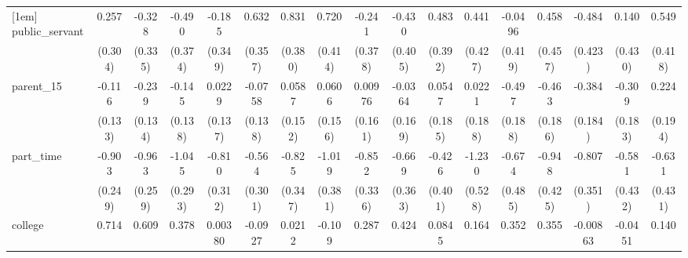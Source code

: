 {\begin{tabular}{l*{16}{c}}
[1em]
public\_servant      &       0.257         &      -0.328         &      -0.490         &      -0.185         &       0.632         &       0.831\sym{*}  &       0.720         &      -0.241         &      -0.430         &       0.483         &       0.441         &     -0.0496         &       0.458         &      -0.484         &       0.140         &       0.549         \\
                    &     (0.304)         &     (0.335)         &     (0.374)         &     (0.349)         &     (0.357)         &     (0.380)         &     (0.414)         &     (0.378)         &     (0.405)         &     (0.392)         &     (0.427)         &     (0.419)         &     (0.457)         &     (0.423)         &     (0.430)         &     (0.418)         \\
[1em]
parent\_15           &      -0.116         &      -0.239         &      -0.145         &      0.0229         &     -0.0758         &      0.0587         &      0.0606         &     0.00976         &     -0.0364         &      0.0547         &      0.0221         &      -0.497\sym{**} &      -0.463\sym{*}  &      -0.384\sym{*}  &      -0.309         &       0.224         \\
                    &     (0.133)         &     (0.134)         &     (0.138)         &     (0.137)         &     (0.138)         &     (0.152)         &     (0.156)         &     (0.161)         &     (0.169)         &     (0.185)         &     (0.188)         &     (0.188)         &     (0.186)         &     (0.184)         &     (0.183)         &     (0.194)         \\
[1em]
part\_time           &      -0.903\sym{***}&      -0.963\sym{***}&      -1.045\sym{***}&      -0.810\sym{**} &      -0.564         &      -0.825\sym{*}  &      -1.019\sym{**} &      -0.852\sym{*}  &      -0.669         &      -0.426         &      -1.230\sym{*}  &      -0.674         &      -0.948\sym{*}  &      -0.807\sym{*}  &      -0.581         &      -0.631         \\
                    &     (0.249)         &     (0.259)         &     (0.293)         &     (0.312)         &     (0.301)         &     (0.347)         &     (0.381)         &     (0.336)         &     (0.363)         &     (0.401)         &     (0.528)         &     (0.485)         &     (0.425)         &     (0.351)         &     (0.432)         &     (0.431)         \\
[1em]
college             &       0.714\sym{***}&       0.609\sym{**} &       0.378         &     0.00380         &     -0.0927         &      0.0212         &      -0.109         &       0.287         &       0.424         &      0.0845         &       0.164         &       0.352         &       0.355         &    -0.00863         &     -0.0451         &       0.140         \\

\end{tabular}}
